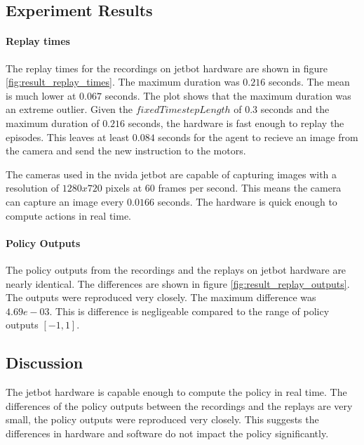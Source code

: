 \subsection{Experiment Results}

\paragraph{Replay times}

The replay times for the recordings on jetbot hardware are shown in figure \ref{fig:result_replay_times}. The maximum duration was $0.216$ seconds. The mean is much lower at $0.067$ seconds. The plot shows that the maximum duration was an extreme outlier.
Given the $fixedTimestepLength$ of $0.3$ seconds and the maximum duration of $0.216$ seconds, the hardware is fast enough to replay the episodes. This leaves at least $0.084$ seconds for the agent to recieve an image from the camera and send the new instruction to the motors.

The cameras used in the nvida jetbot are capable of capturing images with a resolution of $1280x720$ pixels at $60$ frames per second. This means the camera can capture an image every $0.0166$ seconds. The hardware is quick enough to compute actions in real time.


\paragraph{Policy Outputs}

The policy outputs from the recordings and the replays on jetbot hardware are nearly identical. The differences are shown in figure \ref{fig:result_replay_outputs}. The outputs were reproduced very closely. The maximum difference was $4.69e-03$.  This is difference is negligeable compared to the range of policy outputs $[-1,1]$.


\subsection{Discussion}

The jetbot hardware is capable enough to compute the policy in real time. The differences of the policy outputs between the recordings and the replays are very small, the policy outputs were reproduced very closely. This suggests the differences in hardware and software do not impact the policy significantly.


